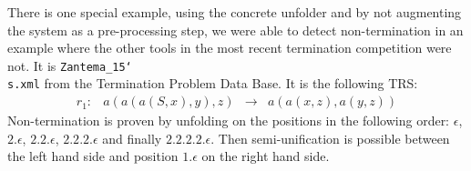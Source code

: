 There is one special example, using the concrete unfolder and by not augmenting the system as a pre-processing step, we were able to detect non-termination in an example where the other tools in the most recent termination competition were not. It is \texttt{Zantema\_15\char`\\s.xml} from the Termination Problem Data Base. It is the following TRS:
\[
\begin{array}{lrcl}
    r_1: & a(a(a(S, x), y), z) & \rightarrow & a(a(x, z), a(y, z)) 
\end{array}
\]
Non-termination is proven by unfolding on the positions in the following order: $\epsilon$, $2.\epsilon$, $2.2.\epsilon$, $2.2.2.\epsilon$ and finally $2.2.2.2.\epsilon$. Then semi-unification is possible between the left hand side and position $1.\epsilon$ on the right hand side. 
